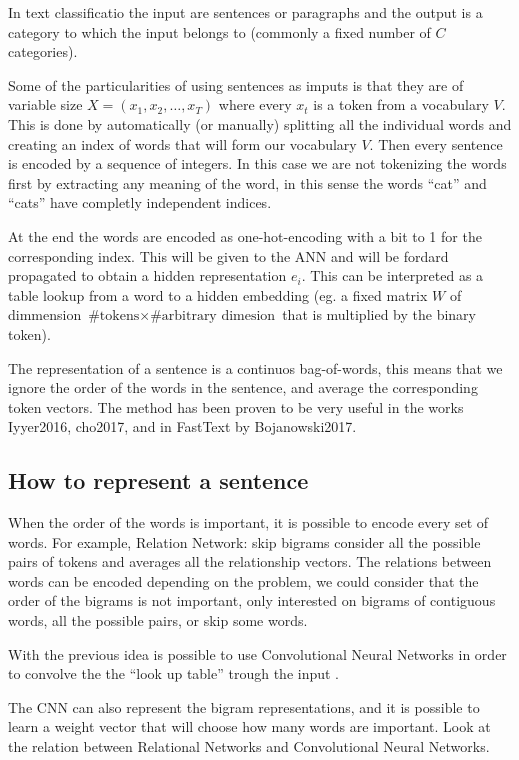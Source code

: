 \documentclass[b5paper]{report}
\begin{document}
In text classificatio the input are sentences or paragraphs and the output is a
category to which the input belongs to (commonly a fixed number of $C$
categories).

Some of the particularities of using sentences as imputs is that they are of
variable size $X = (x_1, x_2, \dots , x_T)$ where every $x_t$ is a token from
a vocabulary $V$. This is done by automatically (or manually) splitting all the
individual words and creating an index of words that will form our vocabulary
$V$. Then every sentence is encoded by a sequence of integers. In this case we
are not tokenizing the words first by extracting any meaning of the word, in
this sense the words ``cat'' and ``cats'' have completly independent indices.

At the end the words are encoded as one-hot-encoding with a bit to 1 for the
corresponding index. This will be given to the ANN and will be fordard
propagated to obtain a hidden representation $e_i$. This can be interpreted as
a table lookup from a word to a hidden embedding (eg. a fixed matrix $W$ of
  dimmension $\text{\#tokens} \times \text{\#arbitrary dimesion}$ that is
multiplied by the binary token).

The representation of a sentence is a continuos bag-of-words, this means that
we ignore the order of the words in the sentence, and average the corresponding
token vectors. The method has been proven to be very useful in the works
Iyyer2016, cho2017, and in FastText by Bojanowski2017.

\subsection{How to represent a sentence}

When the order of the words is important, it is possible to encode every set of
words. For example, Relation Network: skip bigrams consider all the possible
pairs of tokens and averages all the relationship vectors. The relations
between words can be encoded depending on the problem, we could consider that
the order of the bigrams is not important, only interested on bigrams of
contiguous words, all the possible pairs, or skip some words.

With the previous idea is possible to use Convolutional Neural Networks in
order to convolve the the ``look up table'' trough the input
\cite{kim2014convolutional}.

The CNN can also represent the bigram representations, and it is possible to
learn a weight vector that will choose how many words are important. Look at
the relation between Relational Networks and Convolutional Neural Networks.
\end{document}
